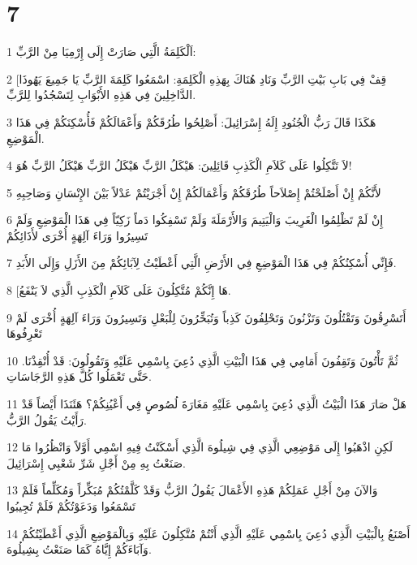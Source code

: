 \chapter{7}

\par 1 اَلْكَلِمَةُ الَّتِي صَارَتْ إِلَى إِرْمِيَا مِنْ الرَّبِّ:
\par 2 [قِفْ فِي بَابِ بَيْتِ الرَّبِّ وَنَادِ هُنَاكَ بِهَذِهِ الْكَلِمَةِ: اسْمَعُوا كَلِمَةَ الرَّبِّ يَا جَمِيعَ يَهُوذَا الدَّاخِلِينَ فِي هَذِهِ الأَبْوَابِ لِتَسْجُدُوا لِلرَّبِّ.
\par 3 هَكَذَا قَالَ رَبُّ الْجُنُودِ إِلَهُ إِسْرَائِيلَ: أَصْلِحُوا طُرُقَكُمْ وَأَعْمَالَكُمْ فَأُسْكِنَكُمْ فِي هَذَا الْمَوْضِعِ.
\par 4 لاَ تَتَّكِلُوا عَلَى كَلاَمِ الْكَذِبِ قَائِلِينَ: هَيْكَلُ الرَّبِّ هَيْكَلُ الرَّبِّ هَيْكَلُ الرَّبِّ هُوَ!
\par 5 لأَنَّكُمْ إِنْ أَصْلَحْتُمْ إِصْلاَحاً طُرُقَكُمْ وَأَعْمَالَكُمْ إِنْ أَجْرَيْتُمْ عَدْلاً بَيْنَ الإِنْسَانِ وَصَاحِبِهِ
\par 6 إِنْ لَمْ تَظْلِمُوا الْغَرِيبَ وَالْيَتِيمَ وَالأَرْمَلَةَ وَلَمْ تَسْفِكُوا دَماً زَكِيّاً فِي هَذَا الْمَوْضِعِ وَلَمْ تَسِيرُوا وَرَاءَ آلِهَةٍ أُخْرَى لأَذَائِكُمْ
\par 7 فَإِنِّي أُسْكِنُكُمْ فِي هَذَا الْمَوْضِعِ فِي الأَرْضِ الَّتِي أَعْطَيْتُ لِآبَائِكُمْ مِنَ الأَزَلِ وَإِلَى الأَبَدِ.
\par 8 [هَا إِنَّكُمْ مُتَّكِلُونَ عَلَى كَلاَمِ الْكَذِبِ الَّذِي لاَ يَنْفَعُ.
\par 9 أَتَسْرِقُونَ وَتَقْتُلُونَ وَتَزْنُونَ وَتَحْلِفُونَ كَذِباً وَتُبَخِّرُونَ لِلْبَعْلِ وَتَسِيرُونَ وَرَاءَ آلِهَةٍ أُخْرَى لَمْ تَعْرِفُوهَا
\par 10 ثُمَّ تَأْتُونَ وَتَقِفُونَ أَمَامِي فِي هَذَا الْبَيْتِ الَّذِي دُعِيَ بِاسْمِي عَلَيْهِ وَتَقُولُونَ: قَدْ أُنْقِذْنَا. حَتَّى تَعْمَلُوا كُلَّ هَذِهِ الرَّجَاسَاتِ.
\par 11 هَلْ صَارَ هَذَا الْبَيْتُ الَّذِي دُعِيَ بِاسْمِي عَلَيْهِ مَغَارَةَ لُصُوصٍ فِي أَعْيُنِكُمْ؟ هَئَنَذَا أَيْضاً قَدْ رَأَيْتُ يَقُولُ الرَّبُّ.
\par 12 لَكِنِ اذْهَبُوا إِلَى مَوْضِعِي الَّذِي فِي شِيلُوهَ الَّذِي أَسْكَنْتُ فِيهِ اسْمِي أَوَّلاً وَانْظُرُوا مَا صَنَعْتُ بِهِ مِنْ أَجْلِ شَرِّ شَعْبِي إِسْرَائِيلَ.
\par 13 وَالآنَ مِنْ أَجْلِ عَمَلِكُمْ هَذِهِ الأَعْمَالَ يَقُولُ الرَّبُّ وَقَدْ كَلَّمْتُكُمْ مُبَكِّراً وَمُكَلِّماً فَلَمْ تَسْمَعُوا وَدَعَوْتُكُمْ فَلَمْ تُجِيبُوا
\par 14 أَصْنَعُ بِالْبَيْتِ الَّذِي دُعِيَ بِاسْمِي عَلَيْهِ الَّذِي أَنْتُمْ مُتَّكِلُونَ عَلَيْهِ وَبِالْمَوْضِعِ الَّذِي أَعْطَيْتُكُمْ وَآبَاءَكُمْ إِيَّاهُ كَمَا صَنَعْتُ بِشِيلُوهَ.
